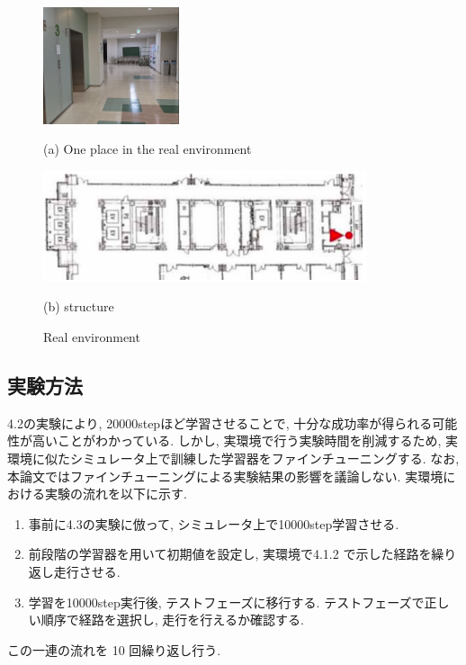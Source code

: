 \begin{itemize}
  \begin{figure}[h]
    \centering
    \begin{minipage}[b]{120mm}
      \centering
      \includegraphics[width=40mm]{images/real.png}
      \caption*{(a) One place in the real environment}
    \end{minipage} 
    \begin{minipage}[b]{120mm}
      \centering
      \includegraphics[width=95mm]{images/tsudanuma_structure.png}
      \caption*{(b) structure}
    \end{minipage}
    \caption{Real environment}
    \label{Fig:real_environment}
  \end{figure}
\end{itemize}

\subsection{実験方法}
4.2の実験により, 20000stepほど学習させることで, 十分な成功率が得られる可能性が高いことがわかっている. しかし, 実環境で行う実験時間を削減するため, 実環境に似たシミュレータ上で訓練した学習器をファインチューニングする. なお, 本論文ではファインチューニングによる実験結果の影響を議論しない. 実環境における実験の流れを以下に示す.
\begin{enumerate}
  \item 事前に4.3の実験に倣って, シミュレータ上で10000step学習させる. 
  \item 前段階の学習器を用いて初期値を設定し, 実環境で4.1.2 で示した経路を繰り返し走行させる.
  \item 学習を10000step実行後, テストフェーズに移行する. テストフェーズで正しい順序で経路を選択し, 走行を行えるか確認する.
\end{enumerate}
この一連の流れを 10 回繰り返し行う.

